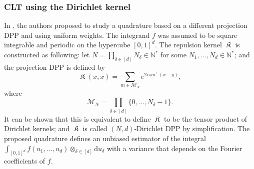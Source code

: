 \documentclass[twoside,11pt]{book}
\numberwithin{theorem}{chapter}
\numberwithin{definition}{chapter}
\numberwithin{proposition}{chapter}
\numberwithin{corollary}{chapter}
\numberwithin{example}{chapter}
\numberwithin{lemma}{chapter}
\DeclareMathOperator{\Tran}{\intercal}
\DeclareMathOperator*{\KDPP}{\mathfrak{K}}
\begin{document}



\subsubsection{CLT using the Dirichlet kernel}
In \citep*{CoMaAm20}, the authors proposed to study a quadrature based on a different projection DPP and using uniform weights. The integrand $f$ was assumed to be square integrable and periodic on the hypercube $[0,1]^{d}$. The repulsion kernel $\KDPP$ is constructed as following: let $N = \prod\limits_{\delta \in [d]}N_{\delta} \in \mathbb{N}^{*}$ for some $N_{1}, \dots, N_{d} \in \mathbb{N}^{*}$; and the projection DPP is defined by
\begin{equation}\label{eq:Dirichlet_kernel}
\KDPP(x,x) = \sum\limits_{m \in \mathcal{M}_{N}}e^{2i \pi m^{\Tran}(x-y) },
\end{equation}
where 
\begin{equation}
\mathcal{M}_{N} = \prod\limits_{\delta \in [d]} \{0, \dots, N_{\delta}-1 \}.
\end{equation}
It can be shown that this is equivalent to define $\KDPP$ to be the tensor product of Dirichlet kernels; and $\KDPP$ is called $(N,d)$-Dirichlet DPP by simplification. 
The proposed quadrature defines an unbiased estimator of the integral $\displaystyle \int_{[0,1]^{d}} f(u_{1}, \dots, u_{d}) \otimes_{\delta \in [d]} \mathrm{d}u_{\delta}$ with a variance that depends on the Fourier coefficients of $f$. 
\end{document}
